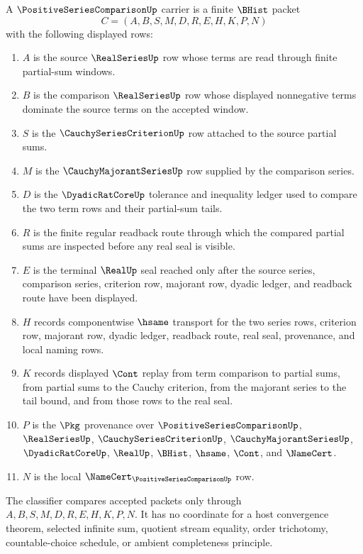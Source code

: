 \begin{definition}
\label{def:positive-series-comparison-carrier}
A $\PositiveSeriesComparisonUp$ carrier is a finite $\BHist$ packet
$$
C=(A,B,S,M,D,R,E,H,K,P,N)
$$
with the following displayed rows:
\begin{enumerate}
\item $A$ is the source $\RealSeriesUp$ row whose terms are read through finite partial-sum windows.
\item $B$ is the comparison $\RealSeriesUp$ row whose displayed nonnegative terms dominate the source terms on the accepted window.
\item $S$ is the $\CauchySeriesCriterionUp$ row attached to the source partial sums.
\item $M$ is the $\CauchyMajorantSeriesUp$ row supplied by the comparison series.
\item $D$ is the $\DyadicRatCoreUp$ tolerance and inequality ledger used to compare the two term rows and their partial-sum tails.
\item $R$ is the finite regular readback route through which the compared partial sums are inspected before any real seal is visible.
\item $E$ is the terminal $\RealUp$ seal reached only after the source series, comparison series, criterion row, majorant row, dyadic ledger, and readback route have been displayed.
\item $H$ records componentwise $\hsame$ transport for the two series rows, criterion row, majorant row, dyadic ledger, readback route, real seal, provenance, and local naming rows.
\item $K$ records displayed $\Cont$ replay from term comparison to partial sums, from partial sums to the Cauchy criterion, from the majorant series to the tail bound, and from those rows to the real seal.
\item $P$ is the $\Pkg$ provenance over $\PositiveSeriesComparisonUp$, $\RealSeriesUp$, $\CauchySeriesCriterionUp$, $\CauchyMajorantSeriesUp$, $\DyadicRatCoreUp$, $\RealUp$, $\BHist$, $\hsame$, $\Cont$, and $\NameCert$.
\item $N$ is the local $\NameCert_{\PositiveSeriesComparisonUp}$ row.
\end{enumerate}
The classifier compares accepted packets only through $A,B,S,M,D,R,E,H,K,P,N$. It has no coordinate for a host convergence theorem, selected infinite sum, quotient stream equality, order trichotomy, countable-choice schedule, or ambient completeness principle.
\end{definition}

